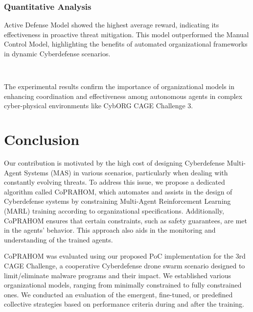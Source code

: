 \documentclass[conference]{IEEEtran}
\begin{document}
\subsubsection{Quantitative Analysis}

{Active Defense Model} showed the highest average reward, indicating its effectiveness in proactive threat mitigation. This model outperformed the Manual Control Model, highlighting the benefits of automated organizational frameworks in dynamic Cyberdefense scenarios.

\

The experimental results confirm the importance of organizational models in enhancing coordination and effectiveness among autonomous agents in complex cyber-physical environments like CybORG CAGE Challenge 3.



\section{Conclusion}\label{sec:conclusion}

Our contribution is motivated by the high cost of designing Cyberdefense Multi-Agent Systems (MAS) in various scenarios, particularly when dealing with constantly evolving threats. To address this issue, we propose a dedicated algorithm called CoPRAHOM, which automates and assists in the design of Cyberdefense systems by constraining Multi-Agent Reinforcement Learning (MARL) training according to organizational specifications. Additionally, CoPRAHOM ensures that certain constraints, such as safety guarantees, are met in the agents' behavior. This approach also aids in the monitoring and understanding of the trained agents.

CoPRAHOM was evaluated using our proposed PoC implementation for the 3rd CAGE Challenge, a cooperative Cyberdefense drone swarm scenario designed to limit/eliminate malware programs and their impact. We established various organizational models, ranging from minimally constrained to fully constrained ones. We conducted an evaluation of the emergent, fine-tuned, or predefined collective strategies based on performance criteria during and after the training.
\end{document}
